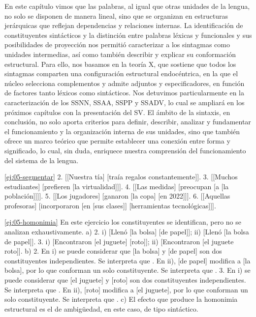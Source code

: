 \begin{recuadro}
En este capítulo vimos que las palabras, al igual que otras unidades de la
lengua, no solo se disponen de manera lineal, sino que se organizan en
estructuras jerárquicas que reflejan dependencias y relaciones internas. La
identificación de constituyentes sintácticos y la distinción entre palabras
léxicas y funcionales y sus posibilidades de proyección nos permitió
caracterizar a los sintagmas como unidades intermedias, así como también
describir y explicar su conformación estructural. Para ello, nos basamos en la
teoría X\prima, que sostiene que todos los sintagmas comparten una
configuración estructural endocéntrica, en la que el núcleo selecciona
complementos y admite adjuntos y especificadores, en función de factores tanto
léxicos como sintácticos. Nos detuvimos particularmente en la caracterización de
los SSNN, SSAA, SSPP y SSADV, lo cual se ampliará en los próximos capítulos con
la presentación del SV. El ámbito de la sintaxis, en conclusión, no solo aporta
criterios para definir, describir, analizar y fundamentar el funcionamiento y
la organización interna de sus unidades, sino que también ofrece un marco
teórico que permite establecer una conexión entre forma y significado, lo cual,
sin duda, enriquece nuestra comprensión del funcionamiento del sistema de la
lengua.
\end{recuadro}

\lecturasrecomendadas

\solucionario

\begin{solucion}{\ref{ej:05-segmentar}}
2. [[Nuestra tía] [traía regalos constantemente]]. 3. [[Muchos estudiantes]
[prefieren [la virtualidad]]]. 4. [[Las medidas] [preocupan [a [la
población]]]]. 5. [[Los jugadores] [ganaron [la copa] [en 2022]]]. 6. [[Aquellas
profesoras] [incorporaron [en [sus clases]] [herramientas tecnológicas]]].
\end{solucion}

\begin{solucion}{\ref{ej:05-homonimia}}
En este ejercicio los constituyentes se identifican, pero no se analizan
exhaustivamente. a) 2. i) [Llenó [la bolsa] [de papel]]; ii) [Llenó [la bolsa
de papel]]. 3. i) [Encontraron [el juguete] [roto]]; ii) [Encontraron [el
juguete roto]]. b) 2. En i) se puede considerar que [la bolsa] y [de papel] son
dos constituyentes independientes. Se interpreta que . En ii), [de papel] modifica a [la bolsa], por lo que conforman un solo
constituyente. Se interpreta que . 3. En i) se
puede considerar que [el juguete] y [roto] son dos constituyentes
independientes. Se interpreta que . En ii), [roto] modifica a [el juguete], por lo que
conforman un solo constituyente. Se interpreta que . c) El efecto que produce la homonimia estructural es el de
ambigüedad, en este caso, de tipo sintáctico.
\end{solucion}

